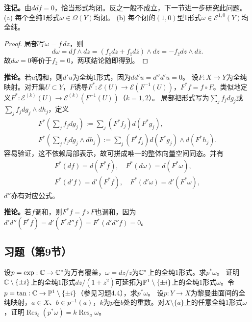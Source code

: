 \textbf{注记。}由$ddf=0$，恰当形式均闭。反之一般不成立，下一节进一步研究此问题。
(a) 每个全纯1形式$\omega\in\Omega(Y)$均闭。
(b) 每个闭的$(1,0)$型1形式$\omega\in\mathcal E^{1,0}(Y)$均全纯。
\begin{proof}
局部写$\omega=f\,dz$，则
\[
d\omega=df\wedge dz=(f_zdz+f_{\bar z}d\bar z)\wedge dz=-f_{\bar z}dz\wedge d\bar z.
\]
故$d\omega=0$等价于$f_{\bar z}=0$，两项结论随即得到。
\end{proof}
\textbf{推论。}若$u$调和，则$d'u$为全纯1形式，因为$dd'u=d''d'u=0$。
设$F:X\to Y$为全纯映射。对开集$U\subset Y$，$F$诱导$F^*:\mathcal E(U)\to\mathcal E(F^{-1}(U))$，$F^*f=f\circ F$。类似地定义$F^*:\mathcal E^{(k)}(U)\to\mathcal E^{(k)}(F^{-1}(U))$（$k=1,2$）。
局部把形式写为$\sum_j f_jdg_j$或$\sum_j f_jdg_j\wedge dh_j$，定义
\begin{gather*}
F^*\left(\sum_jf_jdg_j\right):=\sum_j(F^*f_j)d(F^*g_j),\\
F^*\left(\sum_jf_jdg_j\wedge dh_j\right):=\sum_j(F^*f_j)d(F^*g_j)\wedge d(F^*h_j).
\end{gather*}
容易验证，这不依赖局部表示，故可拼成唯一的整体向量空间同态。并有
\begin{gather*}
F^*(df)=d(F^*f),\quad F^*(d\omega)=d(F^*\omega),\\
F^*(d'f)=d'(F^*f),\quad F^*(d'\omega)=d'(F^*\omega),
\end{gather*}
$d''$亦有对应公式。

\textbf{推论。}若$f$调和，则$F^*f=f\circ F$也调和，因为$d'd''(F^*f)=d'(F^*d''f)=F^*(d'd''f)=0$。
\subsection*{习题（第9节）}
设$p=\exp:\mathbb C\to\mathbb C^*$为万有覆盖，$\omega=dz/z$为$\mathbb C^*$上的全纯1形式。求$p^*\omega$。
证明$\mathbb C\setminus\{\pm i\}$上的全纯1形式$dz/(1+z^2)$可延拓为$\mathbb P^1\setminus\{\pm i\}$上的全纯1形式$\omega$。令$p=\tan:\mathbb C\to\mathbb P^1\setminus\{\pm i\}$（参见习题4.4），求$p^*\omega$。
设$p:Y\to X$为黎曼曲面间的全纯映射，$a\in X$、$b\in p^{-1}(a)$，$k$为$p$在$b$处的重数。对$X\setminus\{a\}$上的任意全纯1形式$\omega$，证明$\operatorname{Res}_b(p^*\omega)=k\operatorname{Res}_a\omega$。
